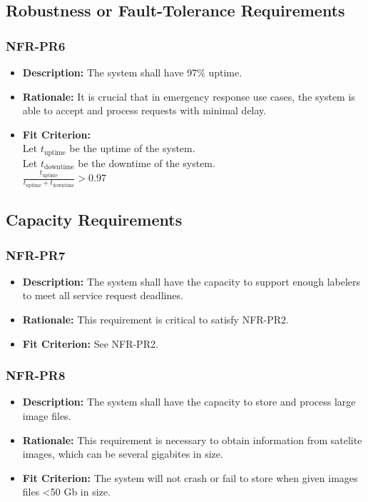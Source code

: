 \documentclass[12pt]{article}
\begin{document}
\subsection{Robustness or Fault-Tolerance Requirements}
\subsubsection*{NFR-PR6}
\begin{itemize}
  \item \textbf{Description:} The system shall have 97\% uptime. 
  \item \textbf{Rationale:} It is crucial that in emergency response use cases, the system is able to accept and process requests with minimal delay.
  \item \textbf{Fit Criterion:}\\ Let $t_{\text{uptime}}$ be the uptime of the system.\\
  Let $t_{\text{downtime}}$ be the downtime of the system.\\
  $\frac{t_{\text{uptime}}}{t_{\text{uptime}} + t_{\text{downtime}}} > 0.97$
\end{itemize}
\subsection{Capacity Requirements}
\subsubsection*{NFR-PR7}
\begin{itemize}
  \item \textbf{Description:} The system shall have the capacity to support enough labelers to meet all service request deadlines.
  \item \textbf{Rationale:} This requirement is critical to satisfy NFR-PR2.
  \item \textbf{Fit Criterion:} See NFR-PR2.
\end{itemize}
\subsubsection*{NFR-PR8}
\begin{itemize}
  \item \textbf{Description:} The system shall have the capacity to store and process large image files.
  \item \textbf{Rationale:} This requirement is necessary to obtain information from satelite images, which can be several gigabites in size.
  \item \textbf{Fit Criterion:} The system will not crash or fail to store when given images files <50 Gb in size.
\end{itemize}
\end{document}

